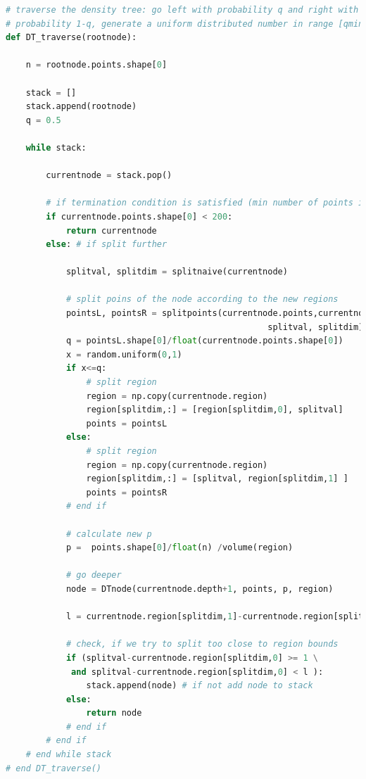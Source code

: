 \documentclass{article}
\begin{document}
\begin{lstlisting}[language=Python]
# traverse the density tree: go left with probability q and right with 
# probability 1-q, generate a uniform distributed number in range [qmin, qmax)
def DT_traverse(rootnode):
    
    n = rootnode.points.shape[0]
    
    stack = []
    stack.append(rootnode)
    q = 0.5
                
    while stack:
        
        currentnode = stack.pop()
  
        # if termination condition is satisfied (min number of points in bin):
        if currentnode.points.shape[0] < 200:
            return currentnode
        else: # if split further
        
            splitval, splitdim = splitnaive(currentnode) 

            # split poins of the node according to the new regions
            pointsL, pointsR = splitpoints(currentnode.points,currentnode.region, \
                                                    splitval, splitdim)
            q = pointsL.shape[0]/float(currentnode.points.shape[0]) 
            x = random.uniform(0,1)        
            if x<=q:
                # split region
                region = np.copy(currentnode.region)
                region[splitdim,:] = [region[splitdim,0], splitval]            
                points = pointsL
            else:
                # split region
                region = np.copy(currentnode.region)       
                region[splitdim,:] = [splitval, region[splitdim,1] ]
                points = pointsR
            # end if
                
            # calculate new p
            p =  points.shape[0]/float(n) /volume(region)
        
            # go deeper
            node = DTnode(currentnode.depth+1, points, p, region)
        
            l = currentnode.region[splitdim,1]-currentnode.region[splitdim,0]   
            
            # check, if we try to split too close to region bounds
            if (splitval-currentnode.region[splitdim,0] >= 1 \
             and splitval-currentnode.region[splitdim,0] < l ):
                stack.append(node) # if not add node to stack
            else:
                return node
            # end if
        # end if        
    # end while stack
# end DT_traverse()
\end{lstlisting}        
 
\end{document}
